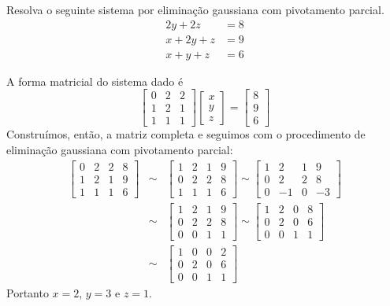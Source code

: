 \begin{exeresol}
Resolva o seguinte sistema por eliminação gaussiana com pivotamento parcial.
\begin{equation}
  \begin{split}
    2y + 2z &= 8\\
    x + 2y + z &= 9\\
    x + y + z &= 6
  \end{split}
\end{equation}
\end{exeresol}
\begin{resol}
A forma matricial do sistema dado é
\begin{equation}
\left[
\begin{array}{ccc}
0 &2& 2\\
1 &2& 1\\
1 & 1 &1
\end{array}
\right]
\left[
\begin{array}{c}
x\\
y\\
z
\end{array}
\right]=
\left[
\begin{array}{c}
8\\
9\\
6
\end{array}
\right]
\end{equation}
Construímos, então, a matriz completa e seguimos com o procedimento de eliminação gaussiana com pivotamento parcial:
\begin{eqnarray}\left[
\begin{array}{ccc|c}
0 &2& 2&8\\
1 &2& 1&9\\
1 & 1 &1&6
\end{array}
\right] &\sim&
\left[
\begin{array}{ccc|c}
1 &2& 1&9\\
0 &2& 2&8\\
1 & 1 &1&6
\end{array}
\right]
\sim
\left[
\begin{array}{ccc|c}
1 &2& 1&9\\
0 &2& 2&8\\
0 & -1 &0&-3
\end{array}
\right]\\
&\sim&
\left[
\begin{array}{ccc|c}
1 &2& 1&9\\
0 &2& 2&8\\
0 & 0 &1&1
\end{array}
\right]
\sim
\left[
\begin{array}{ccc|c}
1 &2& 0&8\\
0 &2& 0&6\\
0 & 0 &1&1
\end{array}
\right]\\
&\sim&
\left[
\begin{array}{ccc|c}
1 &0& 0&2\\
0 &2& 0&6\\
0 & 0 &1&1
\end{array}
\right]
\end{eqnarray}
Portanto $x=2$, $y=3$ e $z=1$.


\end{resol}
